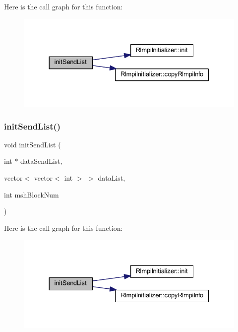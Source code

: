 Here is the call graph for this function\+:
\nopagebreak
\begin{figure}[H]
\begin{center}
\leavevmode
\includegraphics[width=330pt]{register_8C_a4e113cf30f6198d50fb212074effcc61_cgraph}
\end{center}
\end{figure}
\mbox{\label{register_8C_ace23239002b4fdf135d4ad20ae2df6e7}} 
\subsubsection{\texorpdfstring{initSendList()}{initSendList()}\hspace{0.1cm}{\footnotesize\ttfamily [2/2]}}
{\footnotesize\ttfamily void init\+Send\+List (\begin{DoxyParamCaption}\item[{int $\ast$}]{data\+Send\+List,  }\item[{vector$<$ vector$<$ int $>$ $>$}]{data\+List,  }\item[{int}]{msh\+Block\+Num }\end{DoxyParamCaption})}

Here is the call graph for this function\+:
\nopagebreak
\begin{figure}[H]
\begin{center}
\leavevmode
\includegraphics[width=330pt]{register_8C_ace23239002b4fdf135d4ad20ae2df6e7_cgraph}
\end{center}
\end{figure}
\mbox{\label{register_8C_a14fad51cfceca5a582218c98bdb3d769}} 
